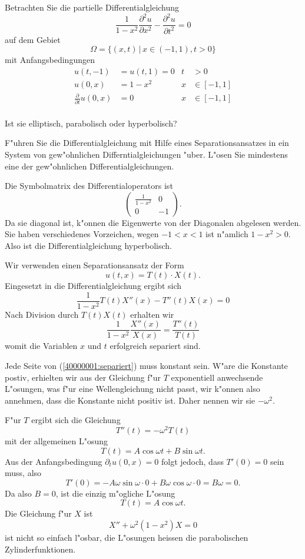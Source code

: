 Betrachten Sie die partielle Differentialgleichung
\[
\frac1{1-x^2}\frac{\partial^2 u}{\partial x^2}
-
\frac{\partial^2 u}{\partial t^2}=0
\]
auf dem Gebiet
\[
\Omega=\{(x,t)\,|\, x\in (-1,1), t>0\}
\]
mit Anfangsbedingungen
\begin{align*}
u(t,-1)&=u(t,1)=0&t&>0\\
u(0,x)&=1-x^2&x&\in[-1,1]\\
\frac{\partial}{\partial t}u(0,x)&=0&x&\in[-1,1]\\
\end{align*}
\begin{teilaufgaben}
\item Ist sie elliptisch, parabolisch oder hyperbolisch?
\item F"uhren Sie die Differentialgleichung mit Hilfe eines
Separationsansatzes in ein System von gew"ohnlichen
Differntialgleichungen "uber. L"osen Sie mindestens eine der
gew"ohnlichen Differentialgleichungen.
\end{teilaufgaben}

\begin{loesung}
\begin{teilaufgaben}
\item
Die Symbolmatrix des Differentialoperators ist
\[
\begin{pmatrix}
\frac1{1-x^2}&0\\0&-1
\end{pmatrix}.
\]
Da sie diagonal ist, k"onnen die Eigenwerte von der Diagonalen
abgelesen werden. Sie haben verschiedenes Vorzeichen, wegen
$-1<x<1$ ist n"amlich $1-x^2>0$. Also ist die Differentialgleichung
hyperbolisch.
\item
Wir verwenden einen Separationsansatz der Form
\[
u(t,x)=T(t)\cdot X(t).
\]
Eingesetzt in die Differentialgleichung ergibt sich
\[
\frac1{1-x^2}T(t)X''(x)-T''(t)X(x)=0
\]
Nach Division durch $T(t)X(t)$ erhalten wir
\begin{equation}
\frac1{1-x^2}\frac{X''(x)}{X(x)}=\frac{T''(t)}{T(t)}
\label{40000001:separiert}
\end{equation}
womit die Variablen $x$ und $t$ erfolgreich separiert sind.

Jede Seite von (\ref{40000001:separiert}) muss konstant sein. W"are die
Konstante postiv, erhielten wir aus der Gleichung f"ur $T$ exponentiell
anwechsende L"osungen, was f"ur eine Wellengleichung nicht passt, wir
k"onnen also annehmen, dass die Konstante nicht positiv ist.
Daher nennen wir sie $-\omega^2$.

F"ur $T$ ergibt sich die Gleichung
\[
T''(t)=-\omega^2 T(t)
\]
mit der allgemeinen L"osung
\[
T(t)=A\cos\omega t+B\sin\omega t.
\]
Aus der Anfangsbedingung $\partial_t u(0,x)=0$ folgt jedoch, dass
$T'(0)=0$ sein muss, also
\[
T'(0)=-A\omega\sin\omega \cdot 0+B\omega\cos\omega\cdot 0=B\omega=0.
\]
Da also $B=0$, ist die einzig m"ogliche L"osung
\[
T(t)=A\cos\omega t.
\]
Die Gleichung f"ur $X$ ist
\[
X''+\omega^2(1-x^2)X=0
\]
ist nicht so einfach l"osbar, die L"osungen heissen die parabolischen
Zylinderfunktionen.
\end{teilaufgaben}
\end{loesung}

